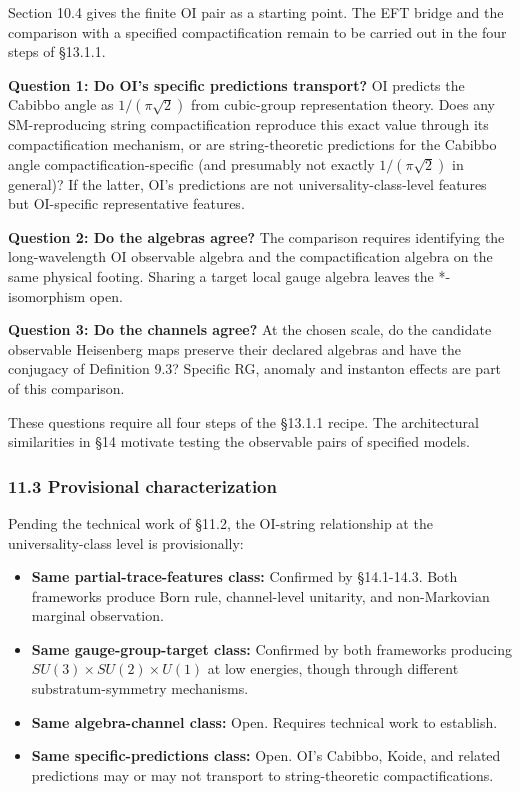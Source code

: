 \documentclass[
]{article}
\providecommand{\tightlist}{%
  \setlength{\itemsep}{0pt}\setlength{\parskip}{0pt}}
\begin{document}
Section 10.4 gives the finite OI pair as a starting point. The EFT
bridge and the comparison with a specified compactification remain to be
carried out in the four steps of §13.1.1.

\textbf{Question 1: Do OI's specific predictions transport?} OI predicts
the Cabibbo angle as \(1/(\pi\sqrt{2})\) from cubic-group representation
theory. Does any SM-reproducing string compactification reproduce this
exact value through its compactification mechanism, or are
string-theoretic predictions for the Cabibbo angle
compactification-specific (and presumably not exactly
\(1/(\pi\sqrt{2})\) in general)? If the latter, OI's predictions are not
universality-class-level features but OI-specific representative
features.

\textbf{Question 2: Do the algebras agree?} The comparison requires
identifying the long-wavelength OI observable algebra and the
compactification algebra on the same physical footing. Sharing a target
local gauge algebra leaves the *-isomorphism open.

\textbf{Question 3: Do the channels agree?} At the chosen scale, do the
candidate observable Heisenberg maps preserve their declared algebras
and have the conjugacy of Definition 9.3? Specific RG, anomaly and
instanton effects are part of this comparison.

These questions require all four steps of the §13.1.1 recipe. The
architectural similarities in §14 motivate testing the observable pairs
of specified models.

\hypertarget{provisional-characterization}{%
\subsubsection{11.3 Provisional
characterization}\label{provisional-characterization}}

Pending the technical work of §11.2, the OI-string relationship at the
universality-class level is provisionally:

\begin{itemize}
\tightlist
\item
  \textbf{Same partial-trace-features class:} Confirmed by §14.1-14.3.
  Both frameworks produce Born rule, channel-level unitarity, and
  non-Markovian marginal observation.
\item
  \textbf{Same gauge-group-target class:} Confirmed by both frameworks
  producing \(SU(3) \times SU(2) \times U(1)\) at low energies, though
  through different substratum-symmetry mechanisms.
\item
  \textbf{Same algebra-channel class:} Open. Requires technical work to
  establish.
\item
  \textbf{Same specific-predictions class:} Open. OI's Cabibbo, Koide,
  and related predictions may or may not transport to string-theoretic
  compactifications.
\end{itemize}
\end{document}
